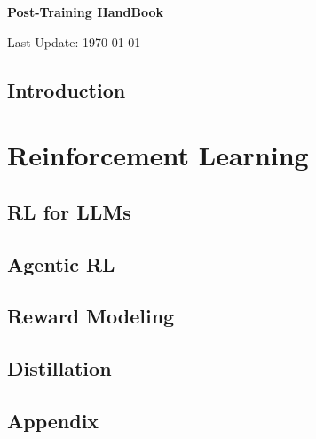\documentclass[10pt,oneside]{book}
\begin{document}
\frontmatter
\hypersetup{linkcolor=black}
\begin{titlepage}
\centering
\vspace*{6cm}
{\Huge\bf\sffamily Post-Training HandBook\par}
\vspace{1.5cm}
{\large\sffamily Last Update: \today\par}
\vfill
\end{titlepage}
\tableofcontents
\hypersetup{linkcolor=softblue}

\mainmatter
\chapter{Introduction}



\part{Reinforcement Learning}
\chapter{RL for LLMs}






% 
% 
\chapter{Agentic RL}




\chapter{Reward Modeling}


\chapter{Distillation}



\appendix
\chapter{Appendix}


\backmatter
\printbibliography
\end{document}
